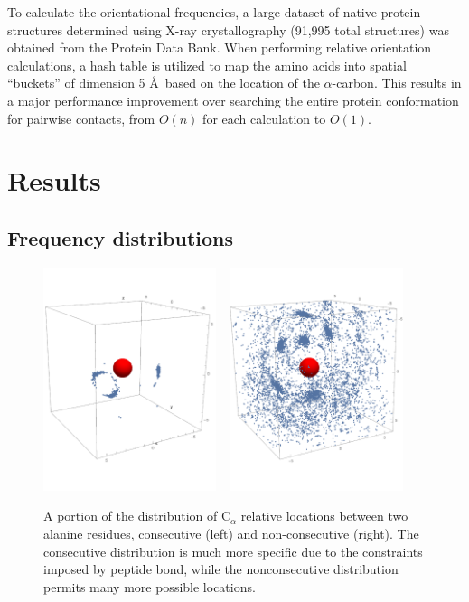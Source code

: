 \documentclass[11pt,titlepage]{article}
\begin{document}
To calculate the orientational frequencies, a large dataset of native protein structures determined using X-ray crystallography (91,995 total structures) was obtained from the Protein Data Bank.
When performing relative orientation calculations, a hash table is utilized to map the amino acids into spatial ``buckets'' of dimension 5 \AA\, based on the location of the $\alpha$-carbon.
This results in a major performance improvement over searching the entire protein conformation for pairwise contacts, from $O(n)$ for each calculation to $O(1)$.

\section{Results}
\subsection{Frequency distributions}
\begin{figure}
	\begin{center}
		\includegraphics[trim={0 3cm 0 3cm}, clip=true, width=0.45\textwidth]{consec_alpha_frequencies}\,\,\,\,\,
		\includegraphics[trim={0 3cm 0 3cm}, clip=true, width=0.45\textwidth]{nonconsec_alpha_frequencies}
		\caption{A portion of the distribution of C$_\alpha$ relative locations between two alanine residues, consecutive (left) and non-consecutive (right). The consecutive distribution is much more specific due to the constraints imposed by peptide bond, while the nonconsecutive distribution permits many more possible locations.}
		\label{alpha_frequencies}
	\end{center}
\end{figure}
\end{document}
